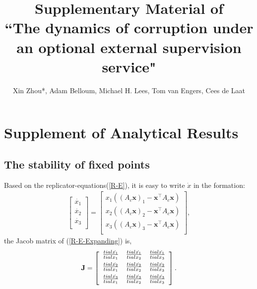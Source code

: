 \documentclass[letterpaper,10pt]{article}
\numberwithin{equation}{section}
\begin{document}
\title{Supplementary Material of\\``The dynamics of corruption under an optional external supervision service"}

\author{Xin Zhou*, Adam Belloum, Michael H. Lees, Tom van Engers, Cees de Laat}

\address{University of Amsterdam, Amsterdam, 1098XH, Netherlands}
\renewcommand{\thesection}{\Alph{section}}

\section{Supplement of Analytical Results}\label{AppendixA} 
\subsection{The stability of fixed points}\label{AppendixA1} %
    Based on the replicator-equations(\ref{R-E}), it is easy to write $ \dot{x} $ in the formation:
    \begin{equation}
        \label{R-E-Expanding}
        \begin{split}
            \left[ \begin{array}{c}
                \dot{x_{1}}\\
                \dot{x_{2}}\\
                \dot{x_{3}}\\
            \end{array}\right] = 
            \left[ \begin{array}{c}
                x_{1}((A_{c}\mathbf{x})_{1}-\mathbf{x}^{\top}A_{c}\mathbf{x})\\
                x_{2}((A_{c}\mathbf{x})_{2}-\mathbf{x}^{\top}A_{c}\mathbf{x})\\
                x_{3}((A_{c}\mathbf{x})_{3}-\mathbf{x}^{\top}A_{c}\mathbf{x})\\
            \end{array}\right],
        \end{split}
    \end{equation}
    the Jacob matrix of (\ref{R-E-Expanding}) is,
    \begin{equation}
        \label{Jacob-M}
        \begin{split}
            \mathbf{J} = \left[ \begin{array}{c c c}
                \frac{tial \dot{x_{1}}}{tial x_{1}} & \frac{tial \dot{x_{1}}}{tial x_{2}} & \frac{tial \dot{x_{1}}}{tial x_{3}} \\[0.5em]
                \frac{tial \dot{x_{2}}}{tial x_{1}} & \frac{tial \dot{x_{2}}}{tial x_{2}} & \frac{tial \dot{x_{2}}}{tial x_{3}} \\[0.5em]
                \frac{tial \dot{x_{3}}}{tial x_{1}} & \frac{tial \dot{x_{3}}}{tial x_{2}} & \frac{tial \dot{x_{3}}}{tial x_{3}} \\[0.5em]
            \end{array}\right].
        \end{split}
    \end{equation}
\end{document}
